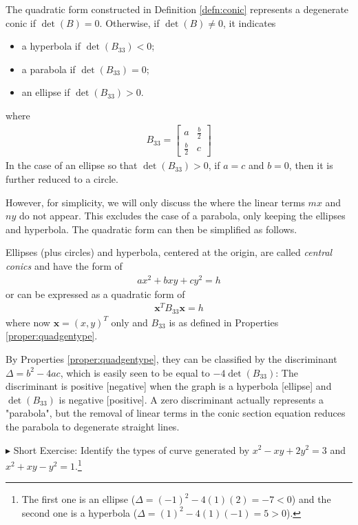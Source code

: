 \begin{proper}
\label{proper:quadgentype}
The quadratic form constructed in Definition \ref{defn:conic} represents a degenerate conic if $\det(B) = 0$. Otherwise, if $\det(B) \neq 0$, it indicates
\begin{itemize}
    \item a hyperbola if $\det(B_{33}) < 0$;
    \item a parabola if $\det(B_{33}) = 0$;
    \item an ellipse if $\det(B_{33}) > 0$.
\end{itemize}
where
\begin{align*}
B_{33} = 
\begin{bmatrix}
a & \frac{b}{2} \\
\frac{b}{2} & c 
\end{bmatrix}
\end{align*}
In the case of an ellipse so that $\det(B_{33}) > 0$, if $a = c$ and $b = 0$, then it is further reduced to a circle.
\end{proper}
However, for simplicity, we will only discuss the  where the linear terms $mx$ and $ny$ do not appear. This excludes the case of a parabola, only keeping the ellipses and hyperbola. The quadratic form can then be simplified as follows.
\begin{proper}
\label{proper:quadcentraltype}
Ellipses (plus circles) and hyperbola, centered at the origin, are called \textit{central conics} and have the form of
\begin{align}
ax^2 + bxy + cy^2 = h
\end{align}
or can be expressed as a quadratic form of
\begin{align}
\textbf{x}^T B_{33} \textbf{x} = h \label{eqn:xB33x}
\end{align}
where now $\textbf{x} = (x,y)^T$ only and $B_{33}$ is as defined in Properties \ref{proper:quadgentype}.
\end{proper}
By Properties \ref{proper:quadgentype}, they can be classified by the discriminant $\Delta = b^2 - 4ac$, which is easily seen to be equal to $-4\det(B_{33})$: The discriminant is positive [negative] when the graph is a hyperbola [ellipse] and $\det(B_{33})$ is negative [positive]. A zero discriminant actually represents a "parabola", but the removal of linear terms in the conic section equation reduces the parabola to degenerate straight lines. \par
$\blacktriangleright$ Short Exercise: Identify the types of curve generated by $x^2 - xy + 2y^2 = 3$ and $x^2 + xy - y^2 = 1$.\footnote{The first one is an ellipse ($\Delta = (-1)^2 - 4(1)(2) = -7 < 0$) and the second one is a hyperbola ($\Delta = (1)^2 - 4(1)(-1) = 5 > 0$).}\par
